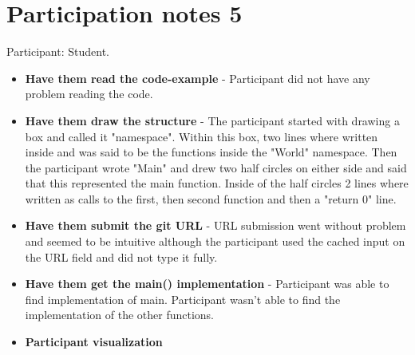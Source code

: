 \section{Participation notes 5}
Participant: Student.

\begin{itemize}
    \item \textbf{Have them read the code-example} - Participant did not have any problem reading the code.
    \item \textbf{Have them draw the structure} - The participant started with drawing a box and called it "namespace". Within this box, two lines where written inside and was said to be the functions inside the "World" namespace. Then the participant wrote "Main" and drew two half circles on either side and said that this represented the main function. Inside of the half circles 2 lines where written as calls to the first, then second function and then a "return 0" line.
    \item \textbf{Have them submit the git URL} - URL submission went without problem and seemed to be intuitive although the participant used the cached input on the URL field and did not type it fully.
    \item \textbf{Have them get the main() implementation} - Participant was able to find implementation of main. Participant wasn't able to find the implementation of the other functions.
    \item \textbf{Participant visualization} 
\end{itemize}